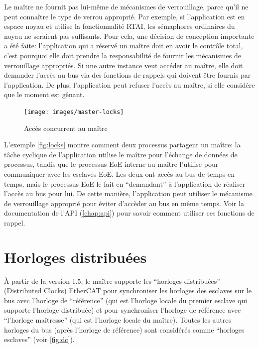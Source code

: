 \documentclass[a4paper,12pt,BCOR=6mm,bibtotoc,idxtotoc]{scrbook}
\begin{document}
Le ma\^itre ne fournit pas lui-m\^eme de m\'ecanismes de
verrouillage, parce qu'il ne peut conna\^itre le type de
verrou appropri\'e. Par exemple, si l'application est en espace noyau
et utilise la fonctionnalit\'e RTAI, les s\'emaphores ordinaires du
noyau ne seraient pas suffisants. Pour cela, une d\'ecision de
conception importante a \'et\'e faite: l'application qui a r\'eserv\'e
un ma\^itre doit en avoir le contr\^ole total, c'est pourquoi elle
doit prendre la responsabilit\'e de fournir les m\'ecanismes de
verrouillage appropri\'es.  Si une autre instance veut acc\'eder au
ma\^itre, elle doit demander l'acc\`es au bus via des fonctions de
rappels qui doivent \^etre fournis par l'application.  De plus,
l'application peut refuser l'acc\`es au ma\^itre, si elle consid\`ere
que le moment est g\^enant.

\begin{figure}[htbp]
  \centering
  \texttt{[image: images/master-locks]}
  \caption{Acc\`es concurrent au ma\^itre}
  \label{fig:locks}
\end{figure}

L'exemple \autoref{fig:locks} montre comment deux processus partagent
un ma\^itre: la t\^ache cyclique de l'application utilise le ma\^itre
pour l'\'echange de donn\'ees de processus, tandis que le processus
EoE interne au ma\^itre l'utilise pour communiquer avec les esclaves
EoE.  Les deux ont acc\`es au bus de temps en temps, mais le processus
EoE le fait en ``demandant'' \`a l'application de r\'ealiser l'acc\`es
au bus pour lui.  De cette mani\`ere, l'application peut utiliser le
m\'ecanisme de verrouillage appropri\'e pour \'eviter d'acc\`eder au
bus en m\^eme temps.  Voir la documentation de l'API
(\autoref{chap:api}) pour savoir comment utiliser ces fonctions de
rappel.


\section{Horloges distribu\'ees}
\label{sec:dc}

\`A partir de la version 1.5, le ma\^itre supporte les ``horloges distribu\'ees'' (Distributed Clocks) EtherCAT pour synchroniser les horloges des esclaves
sur le bus avec l'horloge de ``r\'ef\'erence''
(qui est l'horloge locale du premier esclave qui supporte l'horloge
distribu\'ee) et pour synchroniser l'horloge de r\'ef\'erence avec
``l'horloge ma\^itresse'' (qui est l'horloge locale du ma\^itre).
Toutes les autres horloges du bus (apr\`es l'horloge de r\'ef\'erence)
sont consid\'er\'es comme ``horloges esclaves'' (voir \autoref{fig:dc}).
\end{document}
